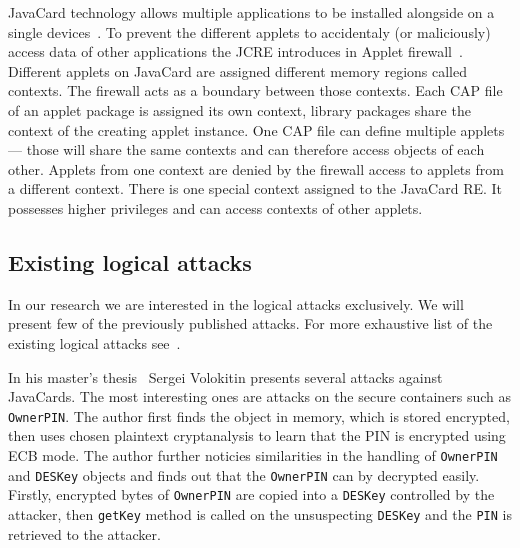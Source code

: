 \documentclass{../llncs/llncs}
\begin{document}
    JavaCard technology allows multiple applications to be installed alongside on a single devices~\cite{jcspecs31download}. To prevent the different applets to accidentaly (or maliciously) access data of other applications the JCRE introduces in Applet firewall~\cite{jcspecs31download}. Different applets on JavaCard are assigned different memory regions called contexts. The firewall acts as a boundary between those contexts. Each CAP file of an applet package is assigned its own context, library packages share the context of the creating applet instance. One CAP file can define multiple applets --- those will share the same contexts and can therefore access objects of each other. Applets from one context are denied by the firewall access to applets from a different context.
    There is one special context assigned to the JavaCard RE. It possesses higher privileges and can access contexts of other applets.


    \subsection{Existing logical attacks}
    In our research we are interested in the logical attacks exclusively. We will present few of the previously published attacks. For more exhaustive list of the existing logical attacks see~\cite{Kvapil2020thesis,sergei,se:oracle:part1,se:oracle:part2,se:oracle:part3}.

    In his master's thesis~\cite{sergei} Sergei Volokitin presents several attacks against JavaCards.
    The most interesting ones are attacks on the secure containers such as \texttt{OwnerPIN}. The author first finds the object in memory, which is stored encrypted, then uses chosen plaintext cryptanalysis to learn that the PIN is encrypted using ECB mode. The author further noticies similarities in the handling of \texttt{OwnerPIN} and \texttt{DESKey} objects and finds out that the \texttt{OwnerPIN} can by decrypted easily. Firstly, encrypted bytes of \texttt{OwnerPIN} are copied into a \texttt{DESKey} controlled by the attacker, then \texttt{getKey} method is called on the unsuspecting \texttt{DESKey} and the \texttt{PIN} is retrieved to the attacker.
\end{document}
